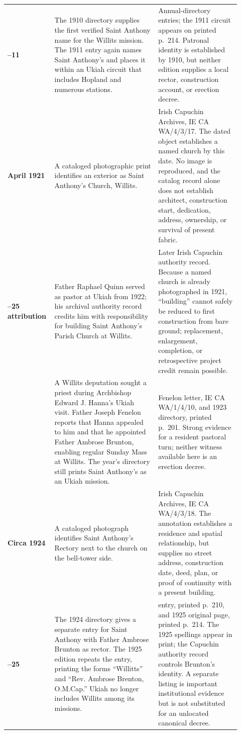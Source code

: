 \begin{longtable}{>{\bfseries\RaggedRight\arraybackslash}p{0.15\linewidth}>{\RaggedRight\arraybackslash}p{0.43\linewidth}>{\RaggedRight\arraybackslash}p{0.34\linewidth}}
1910--11 & The 1910 directory supplies the first verified Saint Anthony name for the Willits mission. The 1911 entry again names Saint Anthony's and places it within an Ukiah circuit that includes Hopland and numerous stations. & Annual-directory entries; the 1911 circuit appears on printed p.~214. Patronal identity is established by 1910, but neither edition supplies a local rector, construction account, or erection decree.\\

4 April 1921 & A cataloged photographic print identifies an exterior as Saint Anthony's Church, Willits. & Irish Capuchin Archives, IE CA WA/4/3/17. The dated object establishes a named church by this date. No image is reproduced, and the catalog record alone does not establish architect, construction start, dedication, address, ownership, or survival of present fabric.\\

1922--25 attribution & Father Raphael Quinn served as pastor at Ukiah from 1922; his archival authority record credits him with responsibility for building Saint Anthony's Parish Church at Willits. & Later Irish Capuchin authority record. Because a named church is already photographed in 1921, ``building'' cannot safely be reduced to first construction from bare ground; replacement, enlargement, completion, or retrospective project credit remain possible.\\

[June] 1923 & A Willits deputation sought a priest during Archbishop Edward J. Hanna's Ukiah visit. Father Joseph Fenelon reports that Hanna appealed to him and that he appointed Father Ambrose Brunton, enabling regular Sunday Mass at Willits. The year's directory still prints Saint Anthony's as an Ukiah mission. & Fenelon letter, IE CA WA/1/4/10, and 1923 directory, printed p.~201. Strong evidence for a resident pastoral turn; neither witness available here is an erection decree.\\

Circa 1924 & A cataloged photograph identifies Saint Anthony's Rectory next to the church on the bell-tower side. & Irish Capuchin Archives, IE CA WA/4/3/18. The annotation establishes a residence and spatial relationship, but supplies no street address, construction date, deed, plan, or proof of continuity with a present building.\\

1924--25 & The 1924 directory gives a separate entry for Saint Anthony with Father Ambrose Brunton as rector. The 1925 edition repeats the entry, printing the forms ``Willitts'' and ``Rev. Ambrose Brenton, O.M.Cap.'' Ukiah no longer includes Willits among its missions. & 1924 entry, printed p.~210, and 1925 original page, printed p.~214. The 1925 spellings appear in print; the Capuchin authority record controls Brunton's identity. A separate listing is important institutional evidence but is not substituted for an unlocated canonical decree.\\


\end{longtable}
